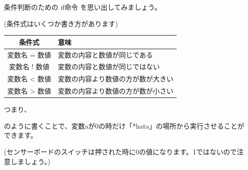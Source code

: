条件判断のための if命令 を思い出してみましょう。


\begin{description}
    \item {}
    \item {}
    \item {}
    \item {}
\end{description}

\begin{center}
    (条件式はいくつか書き方があります)
\end{center}
\begin{center}
    \begin{tabular}{cl} \hline
        条件式 & 意味 \\ \hline
        変数名 = 数値 & 変数の内容と数値が同じである \\
        変数名 ! 数値 & 変数の内容と数値が同じではない \\
        変数名 {\textless} 数値 & 変数の内容より数値の方が数が大きい \\
        変数名 {\textgreater} 数値 & 変数の内容より数値の方が数が小さい \\ \hline
    \end{tabular}
\end{center}

つまり、


\begin{description}
    \item {}
    \item {}
\end{description}


のように書くことで、変数aが0の時だけ「*hata」の場所から実行させることができます。

(センサーボードのスイッチは押された時に0の値になります。1ではないので注意しましょう。)
